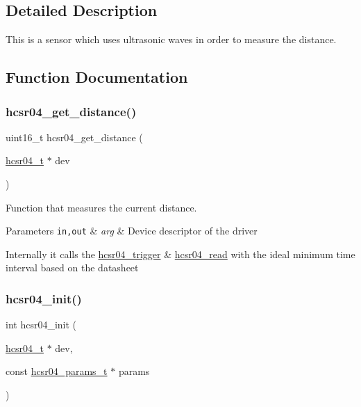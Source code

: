 \subsection{Detailed Description}
This is a sensor which uses ultrasonic waves in order to measure the distance. 



\subsection{Function Documentation}
\mbox{\label{group__drivers__hcsr04_gabef54fa09a72a7aa863aaa03b662125b}} 
\subsubsection{\texorpdfstring{hcsr04\+\_\+get\+\_\+distance()}{hcsr04\_get\_distance()}}
{\footnotesize\ttfamily uint16\+\_\+t hcsr04\+\_\+get\+\_\+distance (\begin{DoxyParamCaption}\item[{\hyperlink{structhcsr04__t}{hcsr04\+\_\+t} $\ast$}]{dev }\end{DoxyParamCaption})}



Function that measures the current distance. 


\begin{DoxyParams}[1]{Parameters}
\mbox{\tt in,out}  & {\em arg} & Device descriptor of the driver\\
\hline
\end{DoxyParams}
Internally it calls the \hyperlink{group__drivers__hcsr04_gabbfe6e650342e8cc67cf9c9e81b29335}{hcsr04\+\_\+trigger} \& \hyperlink{group__drivers__hcsr04_ga449b9d4dc30d3d87d9ee4d8936fb592d}{hcsr04\+\_\+read} with the ideal minimum time interval based on the datasheet \mbox{\label{group__drivers__hcsr04_gabcca3ead68bf012ae42e185e070cb764}} 
\subsubsection{\texorpdfstring{hcsr04\+\_\+init()}{hcsr04\_init()}}
{\footnotesize\ttfamily int hcsr04\+\_\+init (\begin{DoxyParamCaption}\item[{\hyperlink{structhcsr04__t}{hcsr04\+\_\+t} $\ast$}]{dev,  }\item[{const \hyperlink{structhcsr04__params__t}{hcsr04\+\_\+params\+\_\+t} $\ast$}]{params }\end{DoxyParamCaption})}



